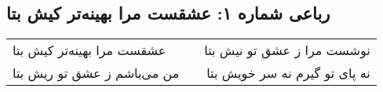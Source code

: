 \begin{center}
\section*{رباعی شماره ۱: عشقست مرا بهینه‌تر کیش بتا}
\label{sec:sh001}
\begin{longtable}{l p{0.5cm} r}
عشقست مرا بهینه‌تر کیش بتا
&&
نوشست مرا ز عشق تو نیش بتا
\\
من می‌باشم ز عشق تو ریش بتا
&&
نه پای تو گیرم نه سر خویش بتا
\\
\end{longtable}
\end{center}
